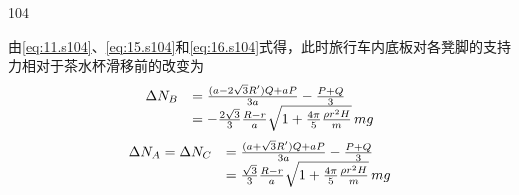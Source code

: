 \begin{solution}{104}
\begin{subsolution}
由\eqref{eq:11.s104}、\eqref{eq:15.s104}和\eqref{eq:16.s104}式得，此时旅行车内底板对各凳脚的支持力相对于茶水杯滑移前的改变为
\begin{equation}
\begin{array}{r l}
\Delta N_{B} & = \frac{(a - 2\sqrt{3}R')Q + aP}{3a} - \frac{P + Q}{3} \\
& = - \frac{2\sqrt{3}}{3}\frac{R - r}{a}\sqrt{1 + \frac{4\pi}{5}\frac{\rho r^{2} H}{m}}\, m g
\end{array}
\label{eq:17.s104}
\end{equation}
\begin{equation}
\begin{array}{r l}
\Delta N_{A} = \Delta N_{C} & = \frac{(a + \sqrt{3}R')Q + aP}{3a} - \frac{P + Q}{3} \\
& = \frac{\sqrt{3}}{3}\frac{R - r}{a}\sqrt{1 + \frac{4\pi}{5}\frac{\rho r^{2} H}{m}}\, m g
\end{array}
\label{eq:18.s104}
\end{equation}
\end{subsolution}
\end{solution}